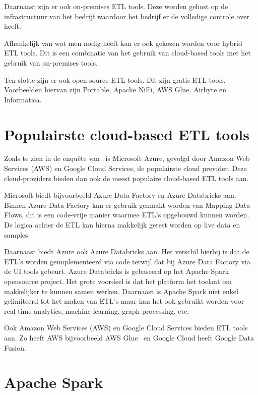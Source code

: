 Daarnaast zijn er ook on-premises ETL tools. Deze worden gehost op de infrastructuur van het bedrijf waardoor het bedrijf er de volledige controle over heeft.~\autocite{Ethan2024}

Afhankelijk van wat men nodig heeft kan er ook gekozen worden voor hybrid ETL tools. Dit is een combinatie van het gebruik van cloud-based tools met het gebruik van on-premises tools.~\autocite{Ethan2024}

Ten slotte zijn er ook open source ETL tools. Dit zijn gratis ETL tools. Voorbeelden hiervan zijn Portable, Apache NiFi, AWS Glue, Airbyte en Informatica.~\autocite{Ethan2024}

\section{Populairste cloud-based ETL tools}

Zoals te zien in de enquête van~\textcite{vines2023overview} is Microsoft Azure, gevolgd door Amazon Web Services (AWS) en Google Cloud Services, de populairste cloud provider. Deze cloud-providers bieden dan ook de meest populaire cloud-based ETL tools aan. 

Microsoft biedt bijvoorbeeld Azure Data Factory en Azure Databricks aan. Binnen Azure Data Factory kan er gebruik gemaakt worden van Mapping Data Flows, dit is een code-vrije manier waarmee ETL's opgebouwd kunnen worden. De logica achter de ETL kan hierna makkelijk getest worden op live data en samples.~\autocite{Kromer2022}

Daarnaast biedt Azure ook Azure Databricks aan. Het verschil hierbij is dat de ETL’s worden geïmplementeerd via code terwijl dat bij Azure Data Factory via de UI tools gebeurt. Azure Databricks is gebaseerd op het Apache Spark opensource project. Het grote voordeel is dat het platform het toelaat om makkelijker te kunnen samen werken. Daarnaast is Apache Spark niet enkel gelimiteerd tot het maken van ETL’s maar kan het ook gebruikt worden voor real-time analytics, machine learning, graph processing, etc.~\autocite{Etaati2019}

Ook Amazon Web Services (AWS) en Google Cloud Services bieden ETL tools aan. Zo heeft AWS bijvoorbeeld AWS Glue~\autocite{Khan2024} en Google Cloud heeft Google Data Fusion.~\autocite{Jaiswal2022}

\section{Apache Spark}
\label{sec:apachespark}

